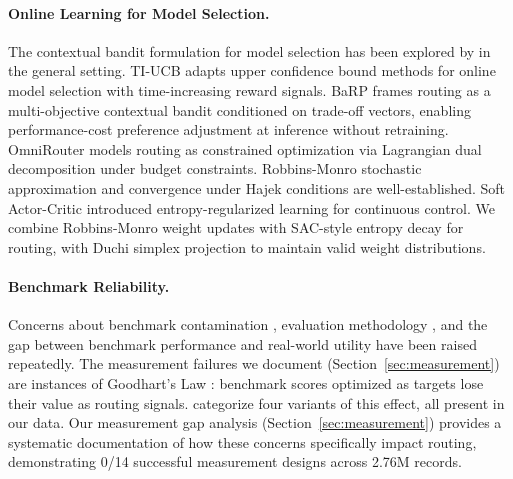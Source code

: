 \paragraph{Online Learning for Model Selection.}
The contextual bandit formulation for model selection has been explored by \citet{agrawal2013thompson} in the general setting. TI-UCB \citep{tiucb2024} adapts upper confidence bound methods for online model selection with time-increasing reward signals. BaRP \citep{barp2025} frames routing as a multi-objective contextual bandit conditioned on trade-off vectors, enabling performance-cost preference adjustment at inference without retraining. OmniRouter \citep{mei2025omnirouter} models routing as constrained optimization via Lagrangian dual decomposition under budget constraints. Robbins-Monro stochastic approximation \citep{robbins1951stochastic} and convergence under Hajek conditions \citep{hajek1988cooling} are well-established. Soft Actor-Critic \citep{haarnoja2018sac} introduced entropy-regularized learning for continuous control. We combine Robbins-Monro weight updates with SAC-style entropy decay for routing, with Duchi simplex projection \citep{duchi2008simplex} to maintain valid weight distributions.

\paragraph{Benchmark Reliability.}
Concerns about benchmark contamination \citep{deng2023leaderboards}, evaluation methodology \citep{liang2022helm}, and the gap between benchmark performance and real-world utility have been raised repeatedly. The measurement failures we document (Section~\ref{sec:measurement}) are instances of Goodhart's Law \citep{goodhart1975monetary}: benchmark scores optimized as targets lose their value as routing signals. \citet{manheim2019categorizing} categorize four variants of this effect, all present in our data. Our measurement gap analysis (Section~\ref{sec:measurement}) provides a systematic documentation of how these concerns specifically impact routing, demonstrating 0/14 successful measurement designs across 2.76M records.

